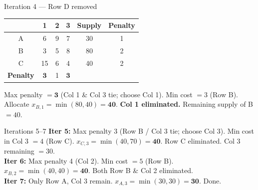 \documentclass[12pt]{article}
\begin{document}
\vspace{6pt}

\begin{iterbox}{Iteration 4 — Row D removed}
\begin{center}
\renewcommand{\arraystretch}{1.25}
\begin{tabular}{|c|c|c|c|c|c|}
  \hline
  \rowcolor{primary}
  & {\color{white}\textbf{1}} & {\color{white}\textbf{2}} &
    {\color{white}\textbf{3}} & {\color{white}\textbf{Supply}} & {\color{white}\textbf{Penalty}} \\
  \hline
  A & 6 & 9 & 7 & 30 & 1 \\
  \hline
  B & 3 & 5 & 8 & 80 & 2 \\
  \hline
  C & 15 & 6 & 4 & 40 & 2 \\
  \hline
  \rowcolor{accent!15}
  \textbf{Penalty} & \cellcolor{gold!40}$\mathbf{3}$ & 1 & \cellcolor{gold!40}$\mathbf{3}$ & & \\
  \hline
\end{tabular}
\end{center}
Max penalty $= \mathbf{3}$ (Col 1 \& Col 3 tie; choose Col 1). Min cost $= 3$ (Row B).
Allocate $x_{B,1} = \min(80,40) = \mathbf{40}$. \textbf{Col 1 eliminated.} Remaining supply of B $= 40$.
\end{iterbox}

\vspace{6pt}

\begin{iterbox}{Iterations 5--7}
\textbf{Iter 5:} Max penalty 3 (Row B / Col 3 tie; choose Col 3). Min cost in Col 3 $= 4$ (Row C).
$x_{C,3}=\min(40,70)=\mathbf{40}$. Row C eliminated. Col 3 remaining $= 30$.\\[4pt]
\textbf{Iter 6:} Max penalty 4 (Col 2). Min cost $= 5$ (Row B). $x_{B,2}=\min(40,40)=\mathbf{40}$. Both Row B \& Col 2 eliminated.\\[4pt]
\textbf{Iter 7:} Only Row A, Col 3 remain. $x_{A,3}=\min(30,30)=\mathbf{30}$. Done.
\end{iterbox}

\vspace{8pt}
\end{document}
